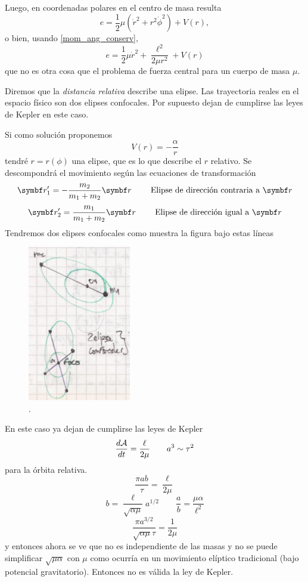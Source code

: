\documentclass[10pt,oneside]{CBFT_book}
\begin{document}
Luego, en coordenadas polares en el centro de masa resulta
\[
	e = \frac{1}{2} \mu ( \dot{ r}^2 + r^2\dot{\phi}^2 ) + V(r),
\]
o bien, usando \eqref{mom_ang_conserv},
\[
	e = \frac{1}{2} \mu \dot{ r}^2 + \frac{\ell^2}{2 \mu r^2 } + V(r)
\]
que no es otra cosa que el problema de fuerza central para un cuerpo de masa $\mu$.

Diremos que la {\it distancia relativa} describe una elipse. Las trayectoria reales en el espacio físico
son dos elipses confocales. Por supuesto dejan de cumplirse las leyes de Kepler en este caso.

Si como solución proponemos
\[
	V(r) = -\frac{\alpha}{r}
\]
tendré $ r = r(\phi) $ una elipse, que es lo que describe el $ r $ relativo.
Se descompondrá el movimiento según las ecuaciones de transformación
\[
	\vb{r}_1'= -\frac{m_2}{m_1+m_2} \vb{r} \qquad \text{ Elipse de dirección contraria a $\vb{r}$}
\]
\[
	\vb{r}_2'= \frac{m_1}{m_1+m_2} \vb{r} \qquad \text{ Elipse de dirección igual a $\vb{r}$}	
\]
Tendremos dos elipses confocales como muestra la figura bajo estas líneas 

\begin{figure}[hbt]
	\begin{center}
	\includegraphics[width=0.4\textwidth]{images/fig_mc_elipses_confocales.pdf}	 
	\end{center}
	\caption{.}
	\label{fig_mc_elipses_confocales}
\end{figure} 

En este caso ya dejan de cumplirse las leyes de Kepler
\[
	\frac{d^{\hspace{-0.05em}} {\mathcal{A}}}{d {t}^{\hspace{-0.05em}}} = \frac{\ell}{2\mu} \qquad a^3 \sim \tau^2 
\]
para la órbita relativa.
\[
	\frac{\pi a b }{\tau}= \frac{\ell}{2\mu} 
\]
\[
	b = \frac{\ell}{\sqrt{\alpha \mu}} a^{1/2} \qquad \frac{a}{b} = \frac{\mu \alpha}{\ell^2}
\]
\[
	\frac{\pi a^{3/2}}{\sqrt{\alpha \mu} \tau} = \frac{1}{2\mu}
\]
y entonces ahora se ve que no es independiente de las masas y no se puede simplificar $\sqrt{\mu\alpha}$ con
$\mu$ como ocurría en un movimiento elíptico tradicional (bajo potencial gravitatorio).
Entonces no es válida la ley de Kepler.
\end{document}
